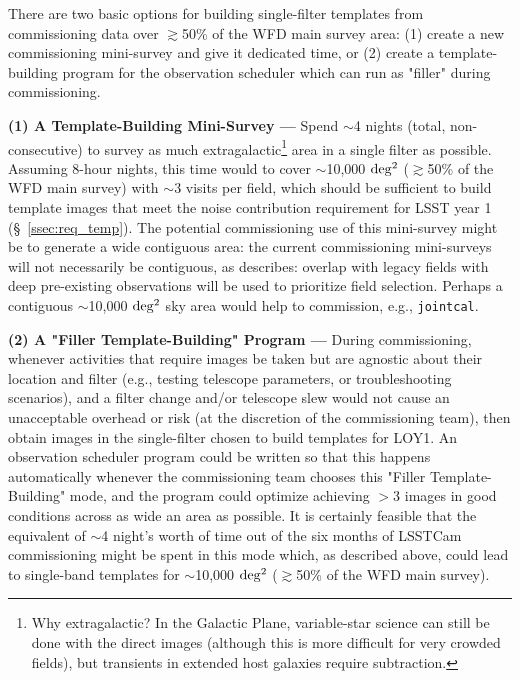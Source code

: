 \documentclass[DM,lsstdraft,toc]{lsstdoc}
\begin{document}
There are two basic options for building single-filter templates from commissioning data over $\gtrsim$50\% of the WFD main survey area: (1) create a new commissioning mini-survey and give it dedicated time, or (2) create a template-building program for the observation scheduler which can run as "filler" during commissioning.

{\bf (1) A Template-Building Mini-Survey ---}
Spend $\sim$4 nights (total, non-consecutive) to survey as much extragalactic\footnote{Why extragalactic? In the Galactic Plane, variable-star science can still be done with the direct images (although this is more difficult for very crowded fields), but transients in extended host galaxies require subtraction.} area in a single filter as possible.
Assuming 8-hour nights, this time would to cover $\sim$10,000 $\rm deg^2$ ($\gtrsim$50\% of the WFD main survey) with $\sim$3 visits per field, which should be sufficient to build template images that meet the noise contribution requirement for LSST year 1 (\S~\ref{ssec:req_temp}).
The potential commissioning use of this mini-survey might be to generate a wide contiguous area: the current commissioning mini-surveys will not necessarily be contiguous, as  describes: overlap with legacy fields with deep pre-existing observations will be used to prioritize field selection.
Perhaps a contiguous $\sim$10,000 $\rm deg^2$ sky area would help to commission, e.g., {\tt jointcal}.

{\bf (2) A "Filler Template-Building" Program ---}
During commissioning, whenever activities that require images be taken but are agnostic about their location and filter (e.g., testing telescope parameters, or troubleshooting scenarios), and a filter change and/or telescope slew would not cause an unacceptable overhead or risk (at the discretion of the commissioning team), then obtain images in the single-filter chosen to build templates for LOY1.
An observation scheduler program could be written so that this happens automatically whenever the commissioning team chooses this "Filler Template-Building" mode, and the program could optimize achieving $>$3 images in good conditions across as wide an area as possible.
It is certainly feasible that the equivalent of $\sim$4 night's worth of time out of the six months of LSSTCam commissioning might be spent in this mode which, as described above, could lead to single-band templates for $\sim$10,000 $\rm deg^2$ ($\gtrsim$50\% of the WFD main survey).
\end{document}
